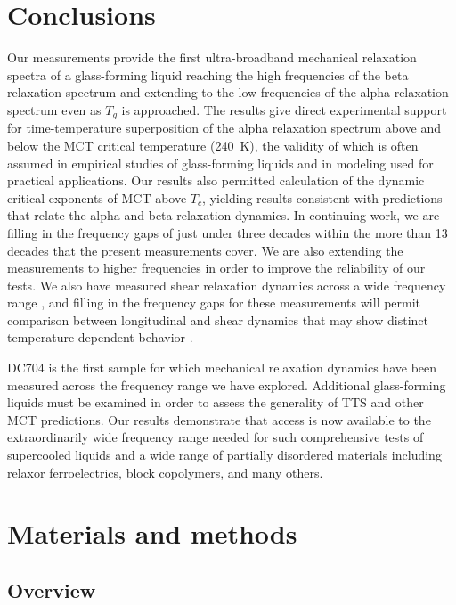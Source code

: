 \documentclass[reprint,showpacs,amsmath,amssymb,aip,jcp]{revtex4-1}
\begin{document}
\section{Conclusions}

Our measurements provide the first ultra-broadband mechanical
relaxation spectra of a glass-forming liquid reaching the high
frequencies of the beta relaxation spectrum and extending to the low
frequencies of the alpha relaxation spectrum even as $T_g$ is
approached. The results give direct experimental support for
time-temperature superposition of the alpha relaxation spectrum above
and below the MCT critical temperature (240~K), the validity of which
is often assumed in empirical studies of glass-forming liquids and in
modeling used for practical applications. Our results also permitted
calculation of the dynamic critical exponents of MCT above $T_c$,
yielding results consistent with predictions that relate the alpha and
beta relaxation dynamics. In continuing work, we are filling in the
frequency gaps of just under three decades within the more than 13
decades that the present measurements cover. We are also extending the
measurements to higher frequencies in order to improve the reliability
of our tests. We also have measured shear relaxation dynamics across a
wide frequency range \cite{Klieber2013}, and filling in the frequency
gaps for these measurements will permit comparison between
longitudinal and shear dynamics that may show distinct
temperature-dependent behavior \cite{Torchinsky2012}.

DC704 is the first sample for which mechanical relaxation dynamics
have been measured across the frequency range we have
explored. Additional glass-forming liquids must be examined in order
to assess the generality of TTS and other MCT predictions. Our results
demonstrate that access is now available to the extraordinarily wide
frequency range needed for such comprehensive tests of supercooled
liquids and a wide range of partially disordered materials including
relaxor ferroelectrics, block copolymers, and many others. 

\section{Materials and methods}

\subsection{Overview}
\end{document}
